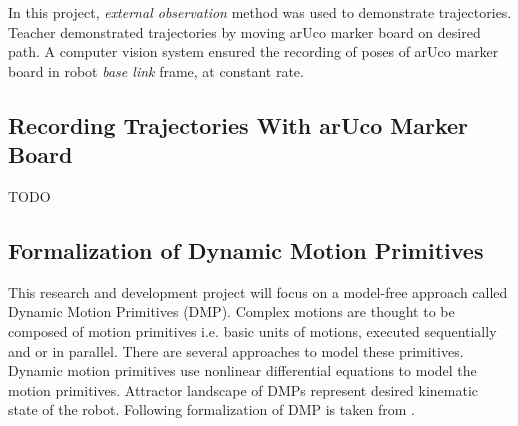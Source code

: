 In this project, \textit{external observation} method was used to demonstrate trajectories. Teacher demonstrated trajectories by moving arUco marker board on desired path. A computer vision system ensured the recording of poses of arUco marker board in robot \textit{base link} frame, at constant rate. 

\subsection{Recording Trajectories With arUco Marker Board}

\color{red} TODO
\color{black}

\subsection{Formalization of Dynamic Motion Primitives}

\par This research and development project will focus on a model-free approach called Dynamic Motion Primitives (DMP). Complex motions are thought to be composed of motion primitives i.e. basic units of motions, executed sequentially and or in parallel. There are several approaches to model these primitives. Dynamic motion primitives use nonlinear differential equations to model the motion primitives. Attractor landscape of DMPs represent desired kinematic state of the robot. 
\newline
Following formalization of DMP is taken from \cite{ijspeert2013dynamical}.

